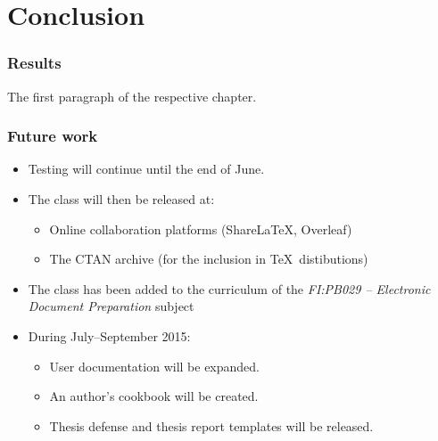 \documentclass[12pt]{article}
\begin{document}
\section{Conclusion}
\begin{frame}
  \frametitle{Results}
  The first paragraph of the respective chapter.
\end{frame}
\begin{frame}
  \frametitle{Future work}
  \begin{itemize}[<+->]
    \item Testing will continue until the end of June.
    \item The class will then be released at:\begin{itemize} 
      \item Online collaboration platforms (Share\LaTeX, Overleaf)
      \item The CTAN archive (for the inclusion in \TeX\ distibutions)
    \end{itemize}
    \item The class has been added to the curriculum of the
      \emph{FI:PB029 -- Electronic Document Preparation} subject
    \item During July--September 2015:\begin{itemize} 
      \item User documentation will be expanded.
      \item An author’s cookbook will be created.
      \item Thesis defense and thesis report templates will be released.
    \end{itemize}
  \end{itemize}
\end{frame}
\ifbeamerarticle
  \printbibliography
\fi
\end{document}

